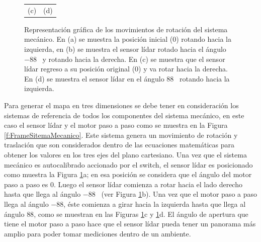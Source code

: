 \begin{figure}
\begin{tabular}{cc}
        (c)&(d)
    \end{tabular}
  \captionsetup{font=footnotesize}
    \caption{\label{f:Rot3D}Representación gráfica de los movimientos de rotación del sistema 
    mecánico. En (a) se muestra la posición inicial (0\grad) rotando hacia la izquierda, en (b) se 
    muestra el sensor lídar rotado hacia el ángulo $-88$\grad~ y rotando hacia la derecha. En (c) 
    se muestra que el sensor lídar regreso a su posición original (0\grad) y va rotar hacia la 
    derecha. En (d) se muestra el sensor lídar en el ángulo $88$\grad~ rotando hacia la izquierda.}
\end{figure}

Para generar el mapa en tres dimensiones se debe tener en consideración los sistemas de 
referencia de todos los componentes del sistema mecánico, en este caso el sensor lídar y el 
motor paso a paso como se muestra en la Figura \ref{f:FrameSitemaMecanico}. Este sistema 
genera un movimiento de rotación y traslación que son considerados dentro de las ecuaciones 
matemáticas para obtener los valores en los tres ejes del plano cartesiano. Una vez que el 
sistema mecánico es autocalibrado accionado por el switch, el sensor lídar es posicionado 
como muestra la Figura \ref{f:Rot3D}a; en esa posición se considera que el ángulo del 
motor paso a paso es 0\grad. Luego el sensor lídar  comienza a rotar hacia el lado 
derecho hasta que llega al ángulo $-88$\grad~ (ver Figura \ref{f:Rot3D}b). Una vez que
el motor paso a paso llega al ángulo $-88$\grad, éste comienza a girar hacia la izquierda 
hasta que llega al ángulo $88$\grad, como se muestran en las Figuras \ref{f:Rot3D}c y 
\ref{f:Rot3D}d. El ángulo de apertura que tiene el motor paso a paso hace que el sensor 
lídar pueda tener un panorama más amplio para poder tomar mediciones dentro de un ambiente.


